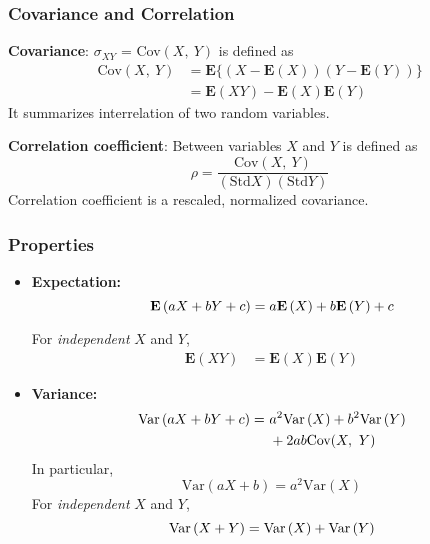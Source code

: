 \begin{multicols}{2}
\subsubsection{Covariance and Correlation}

\textbf{Covariance}: $\sigma_{XY}$ = Cov$(X,\ Y)$ is defined as
    \begin{align*}
        \text{Cov}(X,\ Y) &= \mathbf{E}\{(X - \mathbf{E}(X)) (Y - \mathbf{E}(Y))\}\\
        &= \mathbf{E}(XY) - \mathbf{E}(X)\mathbf{E}(Y)
    \end{align*}
  \quad It summarizes interrelation of two random variables.

\noindent \textbf{Correlation coefficient}: Between variables $X$ and $Y$ is defined as
  \begin{equation*}
    \rho = \frac{\text{Cov}(X,\ Y)}{(\text{Std$X$})(\text{Std$Y$})}
  \end{equation*}
  \quad Correlation coefficient is a rescaled, normalized covariance.

\subsubsection{Properties}

\begin{itemize}
  \item \textbf{Expectation:}
    \begin{equation*}
      \mathbf{E}\left(aX + bY + c\right) = a\mathbf{E}\left(X\right) + b\mathbf{E}\left(Y\right) + c
    \end{equation*}

    For \textit{independent} $X$ and $Y$,
      \begin{align*}
          \mathbf{E}(XY) &= \mathbf{E}(X)\mathbf{E}(Y)
      \end{align*}
  
  \item \textbf{Variance:}
      \begin{align*}
        \text{Var}\left( aX + bY + c \right) =\ &a^2\text{Var}\left( X \right) + b^2\text{Var}\left( Y \right)\\
                            &+ 2ab\text{Cov}(X,\ Y)
      \end{align*}
      In particular,
      \begin{equation*}
        \text{Var}(aX + b) = a^2\text{Var}(X)
      \end{equation*}
      For \textit{independent} $X$ and $Y$,
      \begin{equation*}
        \text{Var}\left( X + Y \right) = \text{Var}\left( X \right) + \text{Var}\left( Y \right)
      \end{equation*}
  

\end{itemize}
\end{multicols}
